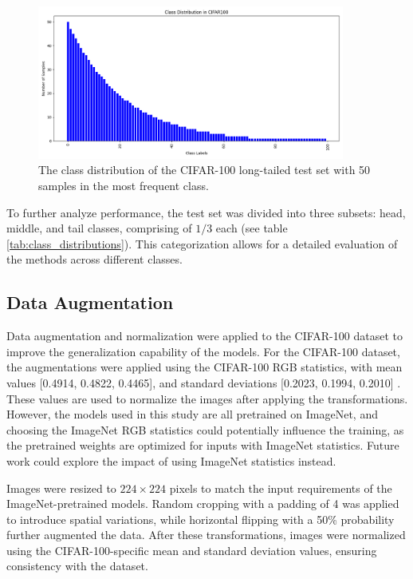 \begin{figure}[h!]
    \centering
    \includegraphics[width=0.9\textwidth]{Images/Plots/cifar100_test_imb.png}
    \caption{The class distribution of the CIFAR-100 long-tailed test set with 50 samples in the most frequent class.}
    \label{fig:cifar100_test_imb}
\end{figure}

To further analyze performance, the test set was divided into three subsets: head, middle, and tail classes, comprising of $1/3$ each (see table \ref{tab:class_distributions}). This categorization allows for a detailed evaluation of the methods across different classes. 


\subsection{Data Augmentation}
Data augmentation and normalization were applied to the CIFAR-100 dataset to improve the generalization capability of the models. For the CIFAR-100 dataset, the augmentations were applied using the CIFAR-100 RGB statistics, with mean values [0.4914, 0.4822, 0.4465], and standard deviations [0.2023, 0.1994, 0.2010] \cite{cao2019learningimbalanceddatasetslabeldistributionaware}. These values are used to normalize the images after applying the transformations. However, the models used in this study are all pretrained on ImageNet, and choosing the ImageNet RGB statistics could potentially influence the training, as the pretrained weights are optimized for inputs with ImageNet statistics. Future work could explore the impact of using ImageNet statistics instead.

Images were resized to $224\times 224$ pixels to match the input requirements of the ImageNet-pretrained models. Random cropping with a padding of 4 was applied to introduce spatial variations, while horizontal flipping with a 50\% probability further augmented the data. After these transformations, images were normalized using the CIFAR-100-specific mean and standard deviation values, ensuring consistency with the dataset.

